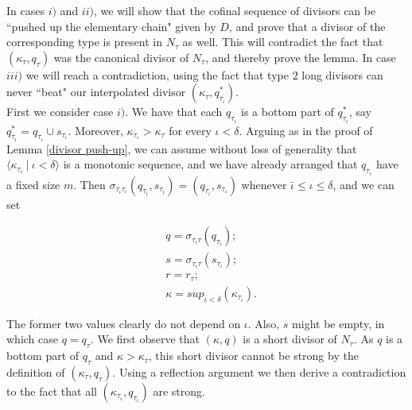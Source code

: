 \documentclass[12pt]{article}
\begin{document}
In cases $i)$ and $ii)$, we will show that the cofinal sequence of divisors can be ``pushed up the elementary chain" given by $D$, and prove that a divisor of the corresponding type is present in $N_\tau$ as well.  This will contradict the fact that $(\kappa_\tau , q_\tau)$ was the canonical divisor of $N_\tau$, and thereby prove the lemma.  In case $iii)$ we will reach a contradiction, using the fact that type $2$ long divisors can never ``beat" our interpolated divisor $( \kappa_\tau , q_{\tau_\iota}^*)$.\\




 First we consider case $i)$.  We have that each $q_{\tau_\iota}$ is a bottom part of $q_{\tau_\iota}^*$, say $q_{\tau_\iota}^* = q_{\tau_\iota} \cup s_{\tau_\iota}$.  Moreover, $\kappa_{\tau_\iota} > \kappa_\tau$ for every $\iota < \delta$.  Arguing as in the proof of Lemma \ref{divisor push-up}, we can assume without loss of generality that $\langle \kappa_{\tau_\iota} \ | \ \iota < \delta \rangle$ is a monotonic sequence, and we have already arranged that $q_{\tau_\iota}$ have a fixed size $m$.  Then $\sigma_{\tau_{\bar{\iota}} \tau_\iota } ( q_{\tau_{\bar{\iota}}} , s_{\tau_{\bar{\iota}}}) = ( q_{\tau_\iota} , s_{\tau_\iota})$ whenever $\bar{\iota} \leq \iota \leq \delta$, and we can set

\[
\begin{split}
& q = \sigma_{\tau_\iota \tau } ( q_{\tau_\iota} ) ; \\
& s = \sigma_{\tau_\iota \tau } ( s_{\tau_\iota} ) ; \\
& r = r_\tau ; \\
& \kappa = sup_{\iota < \delta} ( \kappa_{\tau_\iota} ) .
\end{split}
\]

The former two values clearly do not depend on $\iota$.  Also, $s$ might be empty, in which case $q = q_\tau$.  We first observe that $(\kappa , q )$ is a short divisor of $N_\tau$.  As $q$ is a bottom part of $q_\tau$ and $\kappa > \kappa_\tau$, this short divisor cannot be strong by the definition of $( \kappa_\tau , q_\tau )$.  Using a reflection argument we then derive a contradiction to the fact that all $( \kappa_{\tau_\iota} , q_{\tau_\iota})$ are strong.\\
\end{document}
